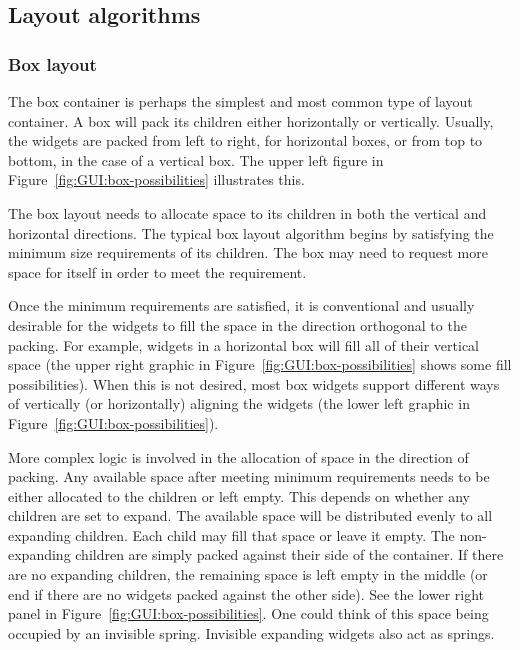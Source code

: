 \subsection{Layout algorithms}
\label{sec:GUI:layout}

\subsubsection{Box layout}
\label{sec:GUI:Box-containers}

The box container is perhaps the simplest and most common type of
layout container. A box will pack its children either horizontally or
vertically. Usually, the widgets are packed from left to right, for
horizontal boxes, or from top to bottom, in the case of a vertical
box.  The upper left figure in Figure~\ref{fig:GUI:box-possibilities}
illustrates this.

The box layout needs to allocate space to its children in both the
vertical and horizontal directions. The typical box layout algorithm
begins by satisfying the minimum size requirements of its
children. The box may need to request more space for itself in order
to meet the requirement. 

Once the minimum requirements are satisfied, it is conventional and
usually desirable for the widgets to fill the space in the direction
orthogonal to the packing. For example, widgets in a horizontal box
will fill all of their vertical space (the upper right graphic in
Figure~\ref{fig:GUI:box-possibilities} shows some fill
possibilities). When this is not desired, most box widgets support
different ways of vertically (or horizontally) aligning the widgets
(the lower left graphic in Figure~\ref{fig:GUI:box-possibilities}).

More complex logic is involved in the allocation of space in the
direction of packing. Any available space after meeting minimum
requirements needs to be either allocated to the children or left
empty. This depends on whether any children are set to expand. The
available space will be distributed evenly to all expanding
children. Each child may fill that space or leave it empty. The
non-expanding children are simply packed against their
side of the container. If there are no expanding children, the
remaining space is left empty in the middle (or end if there are no
widgets packed against the other side). See the lower right
panel in Figure~\ref{fig:GUI:box-possibilities}. One could think
of this space being occupied by an invisible spring. Invisible
expanding widgets also act as springs.


